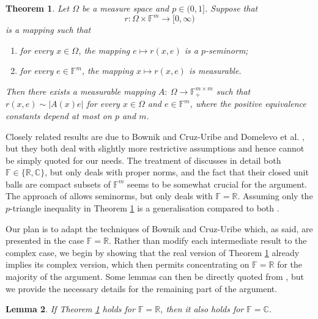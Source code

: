 \documentclass[11pt, reqno]{amsart}
\newtheorem{theorem}{Theorem}[section]
\newtheorem{lemma}[theorem]{Lemma}
\theoremstyle{definition}
\theoremstyle{remark}
\numberwithin{equation}{section}
\newcommand{\C}{\mathbb C}
\newcommand{\F}{\mathbb F}
\newcommand{\R}{\mathbb R}
\newcommand{\abs}[1]{|#1|}
\begin{document}
\begin{theorem}\label{selectA}
Let $\Omega$ be a measure space and $p\in(0,1]$.
Suppose that $$r:\Omega\times\F^m\to[0,\infty)$$ is a mapping such that
\begin{enumerate}
\item[\rm(i)] for every $x\in \Omega$,
the mapping $e\mapsto r(x,e)$ is a $p$-seminorm;

\item[\rm(ii)] for every $e\in\F^m$,
the mapping $x\mapsto r(x,e)$ is measurable.
\end{enumerate}
Then there exists a measurable mapping $A:\ \Omega\to\F_+^{m\times m}$
such that $r(x,e)\sim\abs{A(x)e}$ for every $x\in\Omega$ and $e\in\F^m$,
where the positive equivalence constants depend at most on $p$ and $m$.
\end{theorem}

Closely related results are due to
Bownik and Cruz-Uribe \cite[Sections 3--4]{BCU}
and Domelevo et al. \cite[Appendix A.4]{DKPS}, but they both deal with slightly
more restrictive assumptions and hence cannot be simply quoted
for our needs. The treatment of \cite{DKPS} discusses in detail
both $\F\in\{\R,\C\}$, but only deals with proper norms,
and the fact that their closed unit balls are compact subsets of
$\F^m$ seems to be somewhat crucial for the argument.
The approach of \cite{BCU} allows seminorms, but only deals with $\F=\R$.
Assuming only the $p$-triangle inequality in Theorem \ref{selectA}
is a generalisation compared to both \cite{BCU,DKPS}.

Our plan is to adapt the techniques of Bownik and Cruz-Uribe \cite{BCU} which,
as said, are presented in the case $\F=\R$. Rather than modify
each intermediate result to the complex case, we begin by showing that
the real version of Theorem \ref{selectA} already implies its complex version,
which then permits concentrating on $\F=\R$ for the majority of the argument.
Some lemmas can then be directly quoted from \cite{BCU}, but we
provide the necessary details for the remaining part of the argument.

\begin{lemma}\label{selectA RtoC}
If Theorem \ref{selectA} holds for $\F=\R$, then it also holds for $\F=\C$.
\end{lemma}
\end{document}

